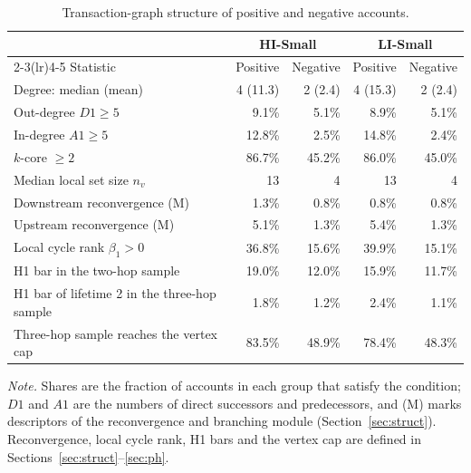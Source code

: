 \begin{table}[htbp]
\centering
\small
\caption{Transaction-graph structure of positive and negative accounts.}
\label{tab:posneg}
\begin{threeparttable}
\begin{tabular}{lrrrr}
\toprule
& \multicolumn{2}{c}{HI-Small} & \multicolumn{2}{c}{LI-Small} \\
\cmidrule(lr){2-3}\cmidrule(lr){4-5}
Statistic & Positive & Negative & Positive & Negative \\
\midrule
Degree: median (mean) & 4 (11.3) & 2 (2.4) & 4 (15.3) & 2 (2.4) \\
Out-degree $D1\ge5$ & 9.1\% & 5.1\% & 8.9\% & 5.1\% \\
In-degree $A1\ge5$ & 12.8\% & 2.5\% & 14.8\% & 2.4\% \\
$k$-core $\ge2$ & 86.7\% & 45.2\% & 86.0\% & 45.0\% \\
Median local set size $n_v$ & 13 & 4 & 13 & 4 \\
Downstream reconvergence (M) & 1.3\% & 0.8\% & 0.8\% & 0.8\% \\
Upstream reconvergence (M) & 5.1\% & 1.3\% & 5.4\% & 1.3\% \\
Local cycle rank $\beta_1>0$ & 36.8\% & 15.6\% & 39.9\% & 15.1\% \\
H1 bar in the two-hop sample & 19.0\% & 12.0\% & 15.9\% & 11.7\% \\
H1 bar of lifetime 2 in the three-hop sample & 1.8\% & 1.2\% & 2.4\% & 1.1\% \\
Three-hop sample reaches the vertex cap & 83.5\% & 48.9\% & 78.4\% & 48.3\% \\
\bottomrule
\end{tabular}
\begin{tablenotes}[flushleft]
\footnotesize
\setlength{\labelsep}{0pt}\item[] \textit{Note.} Shares are the fraction of accounts in each group that satisfy the condition; $D1$ and $A1$ are the numbers of direct successors and predecessors, and (M) marks descriptors of the reconvergence and branching module (Section~\ref{sec:struct}). Reconvergence, local cycle rank, H1 bars and the vertex cap are defined in Sections~\ref{sec:struct}--\ref{sec:ph}.
\end{tablenotes}
\end{threeparttable}
\end{table}
